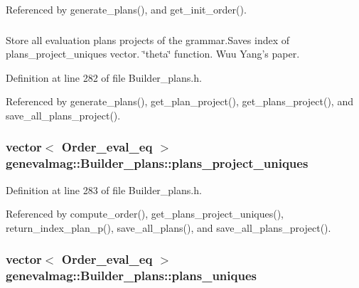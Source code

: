 Referenced by generate\_\-plans(), and get\_\-init\_\-order().\hypertarget{classgenevalmag_1_1Builder__plans_b353b4b6e3b9c72a8fb61ee376a4f76c}{
\subsubsection[{plans\_\-project}]{}}
\label{classgenevalmag_1_1Builder__plans_b353b4b6e3b9c72a8fb61ee376a4f76c}


Store all evaluation plans projects of the grammar.Saves index of plans\_\-project\_\-uniques vector. \char`\"{}theta\char`\"{} function. Wuu Yang's paper. 



Definition at line 282 of file Builder\_\-plans.h.

Referenced by generate\_\-plans(), get\_\-plan\_\-project(), get\_\-plans\_\-project(), and save\_\-all\_\-plans\_\-project().\hypertarget{classgenevalmag_1_1Builder__plans_6a64fd58a3ce6c2f4b6c69df14ffee6e}{
\subsubsection[{plans\_\-project\_\-uniques}]{\setlength{\rightskip}{0pt plus 5cm}vector$<$ {\bf Order\_\-eval\_\-eq} $>$ {\bf genevalmag::Builder\_\-plans::plans\_\-project\_\-uniques}}}
\label{classgenevalmag_1_1Builder__plans_6a64fd58a3ce6c2f4b6c69df14ffee6e}




Definition at line 283 of file Builder\_\-plans.h.

Referenced by compute\_\-order(), get\_\-plans\_\-project\_\-uniques(), return\_\-index\_\-plan\_\-p(), save\_\-all\_\-plans(), and save\_\-all\_\-plans\_\-project().\hypertarget{classgenevalmag_1_1Builder__plans_9cb3fc77b164a22cf37a0ec3e8f78bf7}{
\subsubsection[{plans\_\-uniques}]{\setlength{\rightskip}{0pt plus 5cm}vector$<$ {\bf Order\_\-eval\_\-eq} $>$ {\bf genevalmag::Builder\_\-plans::plans\_\-uniques}}}
\label{classgenevalmag_1_1Builder__plans_9cb3fc77b164a22cf37a0ec3e8f78bf7}




